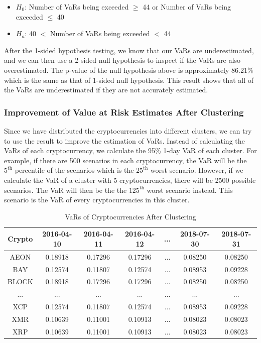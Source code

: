 \documentclass[11pt]{article} %
\theoremstyle{plain}
\theoremstyle{definition}
\begin{document}
\begin{itemize}
    \item \textsl{$H_0$}: Number of VaRs being exceeded $\geq$ 44 or Number of VaRs being exceeded $\leq$ 40
    \item \textsl{$H_a$}: 40 $<$ Number of VaRs being exceeded $<$ 44
\end{itemize}

After the 1-sided hypothesis testing, we know that our VaRs are underestimated, and we can then use a 2-sided null hypothesis to inspect if the VaRs are also overestimated. The p-value of the null hypothesis above is approximately 86.21\% which is the same as that of 1-sided null hypothesis. This result shows that all of the VaRs are underestimated if they are not accurately estimated.

\subsubsection{Improvement of Value at Risk Estimates After Clustering}

Since we have distributed the cryptocurrencies into different clusters, we can try to use the result to improve the estimation of VaRs. Instead of calculating the VaRs of each cryptocurrency, we calculate the 95\% 1-day VaR of each cluster. For example, if there are 500 scenarios in each cryptocurrency, the VaR will be the $5^{\mathrm{th}}$ percentile of the scenarios which is the $25^{\mathrm{th}}$ worst scenario. However, if we calculate the VaR of a cluster with 5 cryptocurrencies, there will be 2500 possible scenarios. The VaR will then be the the $125^{\mathrm{th}}$ worst scenario instead. This scenario is the VaR of every cryptocurrencies in this cluster.

{
  \begin{table}[ht]
    \centering
    \small
    \begin{tabular}{|c|c c c c c c|}
        \hline
        Crypto & 2016-04-10 & 2016-04-11 & 2016-04-12 & ... & 2018-07-30 & 2018-07-31 \\ [0.5ex]
        \hline
        AEON & 0.18918 & 0.17296 & 0.17296 & ... & 0.08250 & 0.08250 \\
        \hline
        BAY & 0.12574 & 0.11807 & 0.12574 & ... & 0.08953 & 0.09228 \\
        \hline
        BLOCK & 0.18918 & 0.17296 & 0.17296 & ... & 0.08250 & 0.08250 \\
        \hline
        ... & ... & ... & ... & ... & ... & ... \\
        \hline
        XCP & 0.12574 & 0.11807 & 0.12574 & ... & 0.08953 & 0.09228 \\
        \hline
        XMR & 0.10639 & 0.11001 & 0.10913 & ... & 0.08023 & 0.08023 \\
        \hline
        XRP & 0.10639 & 0.11001 & 0.10913 & ... & 0.08023 & 0.08023 \\
        \hline
    \end{tabular}
    \caption{VaRs of Cryptocurrencies After Clustering}
    \label{table:varcryptoafter}
  \end{table}
}
\end{document}

